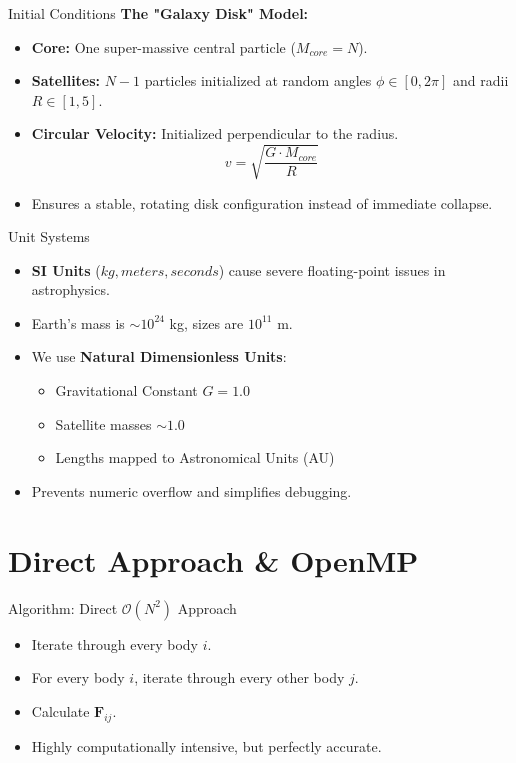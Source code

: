 \documentclass[aspectratio=169]{beamer}
\begin{document}
\begin{frame}{Initial Conditions}
    \textbf{The "Galaxy Disk" Model:}
    \begin{itemize}
        \item \textbf{Core:} One super-massive central particle ($M_{core} = N$).
        \item \textbf{Satellites:} $N-1$ particles initialized at random angles $\phi \in [0, 2\pi]$ and radii $R \in [1, 5]$.
        \item \textbf{Circular Velocity:} Initialized perpendicular to the radius.
        \begin{equation*}
            v = \sqrt{\frac{G \cdot M_{core}}{R}}
        \end{equation*}
        \item Ensures a stable, rotating disk configuration instead of immediate collapse.
    \end{itemize}
\end{frame}

\begin{frame}{Unit Systems}
    \begin{itemize}
        \item \textbf{SI Units} ($kg, meters, seconds$) cause severe floating-point issues in astrophysics.
        \item Earth's mass is $\sim10^{24}$ kg, sizes are $10^{11}$ m.
        \item We use \textbf{Natural Dimensionless Units}:
        \begin{itemize}
            \item Gravitational Constant $G = 1.0$
            \item Satellite masses $\sim 1.0$
            \item Lengths mapped to Astronomical Units (AU)
        \end{itemize}
        \item Prevents numeric overflow and simplifies debugging.
    \end{itemize}
\end{frame}

\section{Direct Approach \& OpenMP}
\begin{frame}{Algorithm: Direct $\mathcal{O}(N^2)$ Approach}
    \begin{itemize}
        \item Iterate through every body $i$.
        \item For every body $i$, iterate through every other body $j$.
        \item Calculate $\mathbf{F}_{ij}$.
        \item Highly computationally intensive, but perfectly accurate.
    \end{itemize}
\end{frame}
\end{document}
